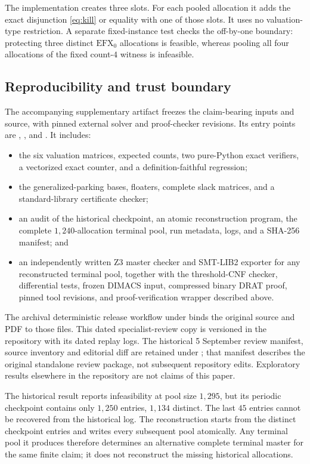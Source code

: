 \documentclass[11pt]{article}
\theoremstyle{plain}
\theoremstyle{definition}
\newcommand{\efxo}{\mathrm{EFX}_0}
\begin{document}
The implementation creates three slots.  For each pooled allocation it adds
the exact disjunction \eqref{eq:kill} or equality with one of those slots.  It
uses no valuation-type restriction.  A separate fixed-instance test checks the
off-by-one boundary: protecting three distinct $\efxo$ allocations is feasible,
whereas pooling all four allocations of the fixed count-$4$ witness is
infeasible.

\subsection{Reproducibility and trust boundary}\label{sec:artifact}

The accompanying supplementary artifact freezes the claim-bearing inputs and
source, with pinned external solver and proof-checker revisions.  Its entry points are
,
, and
.  It includes:
\begin{itemize}[leftmargin=1.6em]
\item the six valuation matrices, expected counts, two pure-Python exact
verifiers, a vectorized exact counter, and a definition-faithful regression;
\item the generalized-parking bases, floaters, complete slack matrices, and a
standard-library certificate checker;
\item an audit of the historical checkpoint, an atomic reconstruction program,
the complete $1{,}240$-allocation terminal pool, run metadata, logs, and a
SHA-256 manifest; and
\item an independently written Z3 \cite{Z3} master checker and SMT-LIB2 exporter
for any reconstructed terminal pool, together with the threshold-CNF checker,
differential tests, frozen DIMACS input, compressed binary DRAT proof, pinned
tool revisions, and proof-verification wrapper described above.
\end{itemize}
The archival deterministic release workflow under  binds
the original source and PDF to those files.  This dated specialist-review
copy is versioned in the repository with its dated replay logs. The historical
5 September review manifest, source inventory and editorial diff are retained
under ; that manifest describes the original
standalone review package, not subsequent repository edits. Exploratory results
elsewhere in the repository are not claims of this paper.

The historical result reports infeasibility at pool size $1{,}295$, but its
periodic checkpoint contains only $1{,}250$ entries, $1{,}134$ distinct.  The
last $45$ entries cannot be recovered from the historical log.  The
reconstruction starts from the distinct checkpoint entries and writes every
subsequent pool atomically.  Any terminal pool it produces therefore determines
an alternative complete terminal master for the same finite claim; it does not
reconstruct the missing historical allocations.
\end{document}
